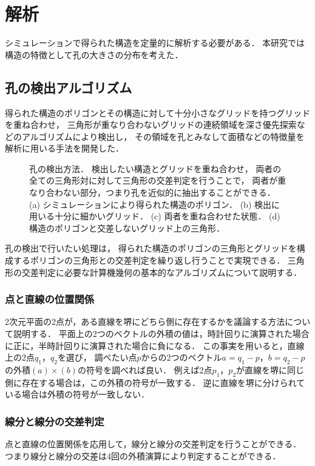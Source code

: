 \section{解析}
シミュレーションで得られた構造を定量的に解析する必要がある．
本研究では構造の特徴として孔の大きさの分布を考えた．

\subsection{孔の検出アルゴリズム}

得られた構造のポリゴンとその構造に対して十分小さなグリッドを持つグリッドを重ね合わせ，
三角形が重なり合わないグリッドの連続領域を深さ優先探索などのアルゴリズムにより検出し，
その領域を孔とみなして面積などの特徴量を解析に用いる手法を開発した．


\begin{figure}
\centering

\caption{
    孔の検出方法．
    検出したい構造とグリッドを重ね合わせ，
    両者の全ての三角形対に対して三角形の交差判定を行うことで，
    両者が重なり合わない部分，つまり孔を近似的に抽出することができる．
    (a) シミュレーションにより得られた構造のポリゴン．
    (b) 検出に用いる十分に細かいグリッド．
    (c) 両者を重ね合わせた状態．
    (d) 構造のポリゴンと交差しないグリッド上の三角形．
}
\label{fig:xor}
\end{figure}


孔の検出で行いたい処理は，
得られた構造のポリゴンの三角形とグリッドを構成するポリゴンの三角形との交差判定を繰り返し行うことで実現できる．
三角形の交差判定に必要な計算機幾何の基本的なアルゴリズムについて説明する．

\subsubsection{点と直線の位置関係}
2次元平面の2点が，ある直線を堺にどちら側に存在するかを議論する方法について説明する．
平面上の2つのベクトルの外積の値は，時計回りに演算された場合に正に，半時計回りに演算された場合に負になる．
この事実を用いると，直線上の2点$q_1$，$q_2$を選び，
調べたい点$p$からの2つのベクトル$a=q_1-p$，$b=q_2-p$の外積$(a)\times(b)$の符号を調べれば良い．
例えば2点$p_1$，$p_2$が直線を堺に同じ側に存在する場合は，この外積の符号が一致する．
逆に直線を堺に分けられている場合は外積の符号が一致しない．

\subsubsection{線分と線分の交差判定}
点と直線の位置関係を応用して，線分と線分の交差判定を行うことができる．
つまり線分と線分の交差は4回の外積演算により判定することができる．

